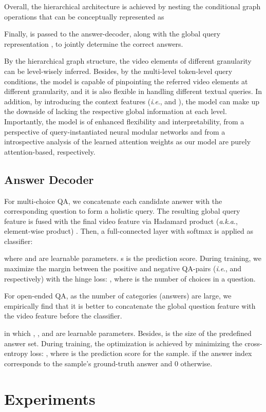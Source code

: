 \documentclass[letterpaper]{article} \usepackage{aaai21}  \usepackage{times}  \usepackage{helvet} \usepackage{courier}  \usepackage[hyphens]{url}  \usepackage{graphicx} \urlstyle{rm} \def\UrlFont{\rm}  \usepackage{natbib}  \usepackage{caption} \usepackage{color, colortbl}
\newcommand{\ie}{\textit{i}.\textit{e}.}
\newcommand{\aka}{\textit{a}.\textit{k}.\textit{a}.}
\begin{document}
Overall, the hierarchical architecture is achieved by nesting the conditional graph operations that can be conceptually represented as

\noindent Finally,  is passed to the answer-decoder, along with the global query representation , to jointly determine the correct answers.

By the hierarchical graph structure, the video elements of different granularity can be level-wisely inferred. Besides, by the multi-level token-level query conditions, the model is capable of pinpointing the referred video elements at different granularity, and it is also flexible in handling different textual queries. In addition, by introducing the context features (\ie,  and ), the model can make up the downside of lacking the respective global information at each level. Importantly, the model is of enhanced flexibility and interpretability, from a perspective of query-instantiated neural modular networks \cite{hu2018explainable} and from a introspective analysis of the learned attention weights as our model are purely attention-based, respectively. 


\subsection{Answer Decoder}
For multi-choice QA, we concatenate each candidate answer with the corresponding question to form a holistic query. The resulting global query feature  is fused with the final video feature  via Hadamard product (\aka, element-wise product) . Then, a full-connected layer with softmax is applied as classifier: 

where  and  are learnable parameters. s is the prediction score. During training, we maximize the margin between the positive and negative QA-pairs (\ie,  and  respectively) with the hinge loss:
,
where  is the number of choices in a question.

For open-ended QA, as the number of categories (answers) are large, we empirically find that it is better to concatenate the global question feature  with the video feature  before the classifier.

in which , , and  are learnable parameters. Besides,  is the size of the predefined answer set. During training, the optimization is achieved by minimizing the cross-entropy loss:
,
where  is the prediction score for the  sample.  if the answer index corresponds to the  sample's ground-truth answer and 0 otherwise.

\section{Experiments}
\end{document}
